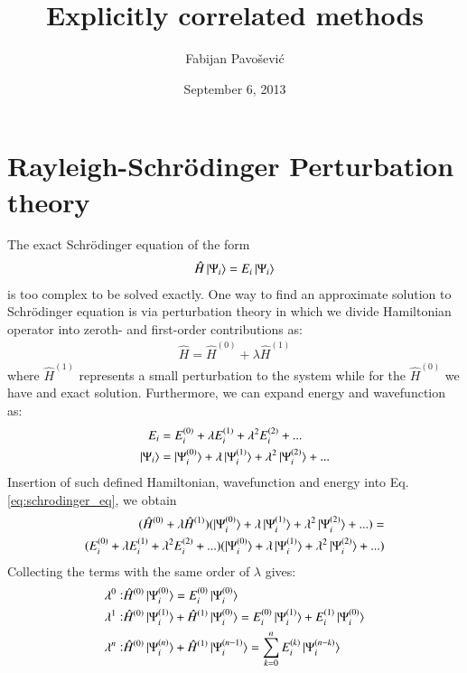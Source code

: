\documentclass[journal=jacsat]{achemso}
\author{Fabijan Pavo\v{s}evi\'{c}}
\affiliation[Virginia Tech]
       {Department of Chemistry, Virginia Tech, Blacksburg, VA}
\title{Explicitly correlated methods}
\date{September 6, 2013}
\numberwithin{equation}{section}
\begin{document}
\maketitle
\newpage
\tableofcontents
\newpage
\section{Rayleigh-Schr\"{o}dinger Perturbation theory}
The exact Schr\"{o}dinger equation of the form
\begin{align}
\label{eq:schrodinger_eq}
\hat{H}\ket{\Psi_{i}}=E_{i}\ket{\Psi_{i}}
\end{align}
is too complex to be solved exactly. One way to find an approximate solution to Schr\"{o}dinger equation is via perturbation theory in which we divide Hamiltonian operator into zeroth- and first-order contributions as:
\begin{align}
\hat{H}=\hat{H}^{(0)} + \lambda\hat{H}^{(1)}
\end{align}
where $ \hat{H}^{(1)}$ represents a small perturbation to the system while for the  $\hat{H}^{(0)}$ we have and exact solution. Furthermore, we can expand energy and wavefunction as:
\begin{align}
E_{i} &= E_{i}^{(0)} + \lambda E_{i}^{(1)} + \lambda^{2} E_{i}^{(2)} + ...\\
\ket{\Psi_{i}} &= \ket{\Psi_{i}^{(0)}} + \lambda \ket{\Psi_{i}^{(1)}} + \lambda^{2} \ket{\Psi_{i}^{(2)}} + ...
\end{align}
Insertion of such defined Hamiltonian, wavefunction and energy into Eq. \ref{eq:schrodinger_eq}, we obtain
\begin{align}
(\hat{H}^{(0)} + \lambda\hat{H}^{(1)})(\ket{\Psi_{i}^{(0)}} + \lambda \ket{\Psi_{i}^{(1)}} + \lambda^{2} \ket{\Psi_{i}^{(2)}} + ...)=\\
(E_{i}^{(0)} + \lambda E_{i}^{(1)} + \lambda^{2} E_{i}^{(2)} + ...)
(\ket{\Psi_{i}^{(0)}} + \lambda \ket{\Psi_{i}^{(1)}} + \lambda^{2} \ket{\Psi_{i}^{(2)}} + ...)
\end{align}
Collecting the terms with the same order of $\lambda$ gives:
 \begin{align}
\lambda^{0}:& \hat{H}^{(0)}\ket{\Psi_{i}^{(0)}}=E_{i}^{(0)}\ket{\Psi_{i}^{(0)}}\\
\lambda^{1}:&  \hat{H}^{(0)}\ket{\Psi_{i}^{(1)}} + \hat{H}^{(1)}\ket{\Psi_{i}^{(0)}}=E_{i}^{(0)}\ket{\Psi_{i}^{(1)}}+E_{i}^{(1)}\ket{\Psi_{i}^{(0)}}\\
\lambda^{n}:&  \hat{H}^{(0)}\ket{\Psi_{i}^{(n)}} + \hat{H}^{(1)}\ket{\Psi_{i}^{(n-1)}}=\sum_{k=0}^{n}E_{i}^{(k)}\ket{\Psi_{i}^{(n-k)}}
\end{align}
\end{document}
